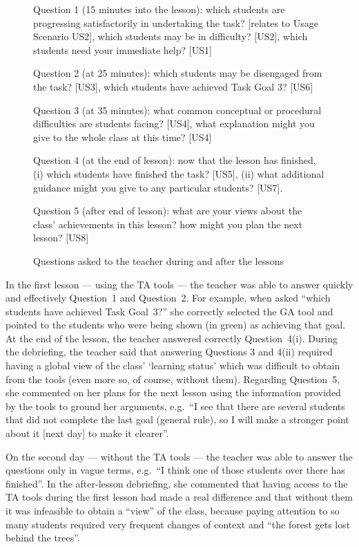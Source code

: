 \begin{figure}[hbtp]
  Question 1 (15 minutes into the lesson): which students are
  progressing satisfactorily in undertaking the task? [relates to
  Usage Scenario US2], which students may be in difficulty?
  [US2], which students need your immediate help? [US1]

  Question 2 (at 25 minutes): which students may be disengaged from the task?
  [US3], which students have achieved Task Goal 3? [US6]

  Question 3 (at 35 minutes): what common conceptual or procedural
  difficulties are students facing? [US4], what explanation might you
  give to the whole class at this time? [US4]

  Question 4 (at the end of lesson): now that the lesson has finished,
  (i) which students have finished the task? [US5], 
  (ii) what additional guidance might you give to any particular students? [US7].

  Question 5 (after end of lesson): what are your views about the
  class' achievements in this lesson? how might you plan the next
  lesson? [US8]

  \caption{Questions asked to the teacher during and after the lessons}
  \label{fig:summquest}
\end{figure}

 

In the first lesson --- using the TA tools --- the
teacher was able to answer quickly and effectively Question~1 and
Question~2. For example, when asked ``which students have achieved Task
Goal~3?'' she correctly selected the GA tool and
pointed to the students who were being shown (in green) as achieving
that goal. At the end of the lesson, the teacher answered correctly
Question~4(i). 
%
During the debriefing, the teacher said that
answering Questions 3 and 4(ii) required having a global view of the
class' `learning status' which was difficult to obtain from the tools (even
more so, of course, without them).
% 
%
Regarding Question~5, she commented on her plans for the next lesson
using the information provided by the tools to ground her arguments, e.g.~``I
see that there are several students that did not complete the last
goal (general rule), so I will make a stronger point about it [next
day] to make it clearer''. 


On the second day --- without the TA tools --- the teacher was able to
answer the questions only in vague terms, e.g.~``I think one of
those students over there has finished''. In the after-lesson debriefing,
she commented that having access to the TA tools during the first lesson 
had made a real difference and that without them it was infeasible to 
obtain a ``view'' of the class, because
paying attention to so many students required very frequent changes of
context and ``the forest gets lost behind the trees''. 



